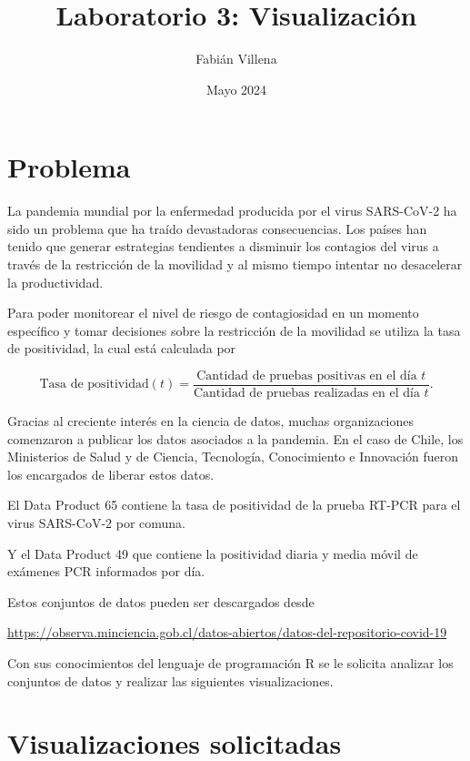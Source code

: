 \documentclass{article}
\title{Laboratorio 3: Visualización}
\author{Fabián Villena}
\date{Mayo 2024}
\begin{document}
\maketitle

\section{Problema}

La pandemia mundial por la enfermedad producida por el virus SARS-CoV-2 ha sido un problema que ha traído devastadoras consecuencias. Los países han tenido que generar estrategias tendientes a disminuir los contagios del virus a través de la restricción de la movilidad y al mismo tiempo intentar no desacelerar la productividad.

Para poder monitorear el nivel de riesgo de contagiosidad en un momento específico y tomar decisiones sobre la restricción de la movilidad se utiliza la tasa de positividad, la cual está calculada por 

\begin{equation}
\textrm{Tasa de positividad}(t) = \frac{\textrm{Cantidad de pruebas positivas en el día } t}{\textrm{Cantidad de pruebas realizadas en el día } t}.
\end{equation}

Gracias al creciente interés en la ciencia de datos, muchas organizaciones comenzaron a publicar los datos asociados a la pandemia. En el caso de Chile, los Ministerios de Salud y de Ciencia, Tecnología, Conocimiento e Innovación fueron los encargados de liberar estos datos.

El Data Product 65 contiene la tasa de positividad de la prueba RT-PCR para el virus SARS-CoV-2 por comuna.

Y el Data Product 49 que contiene la positividad diaria y media móvil de exámenes PCR informados por día.

Estos conjuntos de datos pueden ser descargados desde

\begin{center}
    \url{https://observa.minciencia.gob.cl/datos-abiertos/datos-del-repositorio-covid-19}
\end{center}

Con sus conocimientos del lenguaje de programación R se le solicita analizar los conjuntos de datos y realizar las siguientes visualizaciones.

\section{Visualizaciones solicitadas}
\end{document}
